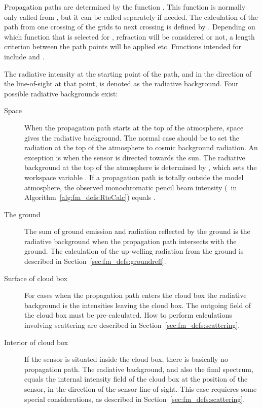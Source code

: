 Propagation paths are determined by the function .
This function is normally only called from , but it
can be called separately if needed. The calculation of the path from
one crossing of the grids to next crossing is defined by
. Depending on which function that is
selected for , refraction will be
considered or not, a length criterion between the path points will be
applied etc. Functions intended for 
include  and
.


\label{sec:fm_defs:rad_bkgr}

The radiative intensity at the starting point of the path, and in the
direction of the line-of-sight at that point, is denoted as the
radiative background. Four possible radiative backgrounds exist:
\begin{description}
\item[Space] When the propagation path starts at the top of the
  atmosphere, space gives the radiative background. The normal case
  should be to set the radiation at the top of the atmosphere to
  cosmic background radiation. An exception is when the sensor is
  directed towards the sun. The radiative background at the top of
  the atmosphere is determined by , which
  sets the workspace variable . If a propagation
  path is totally outside the model atmosphere, the observed
  monochromatic pencil beam intensity (\ in
  Algorithm~\ref{alg:fm_defs:RteCalc}) equals .
\item[The ground] The sum of ground emission and radiation reflected
  by the ground is the radiative background when the propagation path
  intersects with the ground. The calculation of the up-welling
  radiation from the ground is described in
  Section~\ref{sec:fm_defs:groundrefl}.
\item[Surface of cloud box] For cases when the propagation path enters
  the cloud box the radiative background is the intensities leaving
  the cloud box. The outgoing field of the cloud box must be
  pre-calculated. How to perform calculations involving scattering are
  described in Section~\ref{sec:fm_defs:scattering}.
\item[Interior of cloud box] If the sensor is situated inside the
  cloud box, there is basically no propagation path. The radiative
  background, and also the final spectrum, equals the internal
  intensity field of the cloud box at the position of the sensor, in
  the direction of the sensor line-of-sight.  This case requieres
  some special considerations, as described in
  Section~\ref{sec:fm_defs:scattering}.
\end{description}
